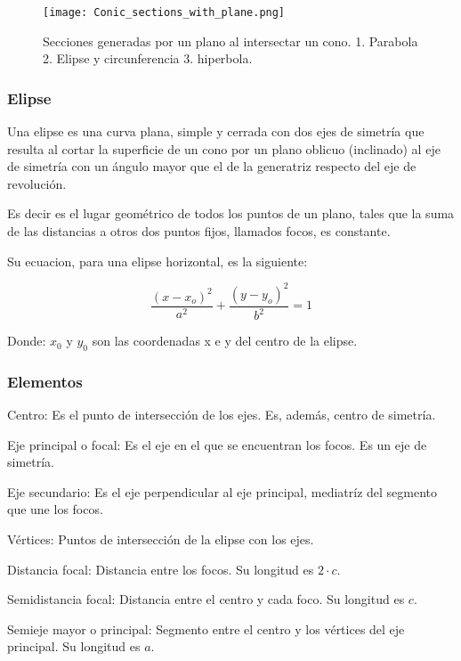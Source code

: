     \begin{figure}[htb]
 		\centering
		\texttt{[image: Conic\_sections\_with\_plane.png]}
        \caption{Secciones generadas por un plano al intersectar un cono.
        \vspace*{0.5cm}
        1. Parabola 2. Elipse y circunferencia 3. hiperbola.}
		\label{secciones}
	\end{figure}


    \subsubsection*{Elipse} \label{Elipse}


    Una elipse es una curva plana, simple y cerrada con dos ejes de
    simetría que resulta al cortar la superficie de un cono por un plano
    oblicuo (inclinado) al eje de simetría con un ángulo mayor que el de la
    generatriz respecto del eje de revolución.

    Es decir es el lugar geométrico de todos los puntos de un plano, tales que
    la suma de las distancias a otros dos puntos fijos, llamados focos, es
    constante.

    Su ecuacion, para una elipse horizontal,  es la siguiente:


    $$ \frac{(x-x_o)^2}{a^2} + \frac{(y-y_o)^2}{b^2} = 1 $$

    Donde: $x_0$ y $y_0$ son las coordenadas x e y del centro de la elipse.


    \subsubsection*{Elementos} \label{Elementos}

    Centro: Es el punto de intersección de los ejes. Es, además, centro de
    simetría.

    Eje principal o focal: Es el eje en el que se encuentran los focos. Es un
    eje de simetría.

    Eje secundario: Es el eje perpendicular al eje principal, mediatríz del
    segmento que une los focos.

    Vértices: Puntos de intersección de la elipse con los ejes.

    Distancia focal: Distancia entre los focos. Su longitud es $2\cdot c$.

    Semidistancia focal: Distancia entre el centro y cada foco. Su longitud es
    $c$.

    Semieje mayor o principal: Segmento entre el centro y los vértices del eje
    principal. Su longitud es $a$.

